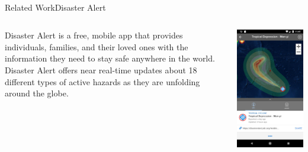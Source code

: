 \documentclass{beamer}
\begin{document}
\begin{frame}{Related Work}{Disaster Alert\textsuperscript{\texttrademark}}

\begin{columns}


\begin{column}{0.4\linewidth}
Disaster Alert is a free, mobile app that provides individuals, families, and their loved ones with the information they need to stay safe anywhere in the world. Disaster Alert offers near real-time updates about 18 different types of active hazards as they are unfolding around the globe.
\end{column}

\begin{column}{0.4\linewidth}
    \includegraphics[width=\textwidth]{appImages/DA1.jpg}
\end{column}
\end{columns}

\end{frame}
\end{document}
